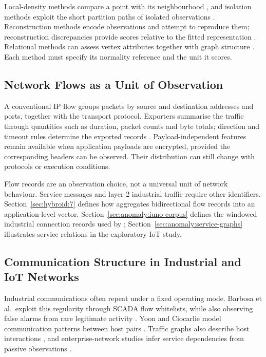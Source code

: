 Local-density methods compare a point with its neighbourhood \cite{breunig2000lof}, and
isolation methods exploit the short partition paths of isolated observations
\cite{liu2008isolation}. Reconstruction methods encode observations and attempt to reproduce
them; reconstruction discrepancies provide scores relative to the fitted representation
\cite{ruff2021unifying,pang2021deep}. Relational methods can assess vertex attributes
together with graph structure \cite{akoglu2015graph}. Each method must specify its normality
reference and the unit it scores.

\subsection{Network Flows as a Unit of Observation}
\label{sec:background:networks:flows}

A conventional IP flow groups packets by source and destination addresses and ports, together
with the transport protocol. Exporters summarise the traffic through quantities such as
duration, packet counts and byte totals; direction and timeout rules determine the exported
records \cite{sperotto2010overview}. Payload-independent features remain available when
application payloads are encrypted, provided the corresponding headers can be observed.
Their distribution can still change with protocols or execution conditions.

Flow records are an observation choice, not a universal unit of network behaviour. Service
messages and layer-2 industrial traffic require other identifiers.
Section~\ref{sec:hybroid:7} defines how \hybroid{} aggregates bidirectional flow records into
an application-level vector. Section~\ref{sec:anomaly:iuno-corpus} defines the windowed industrial
connection records used by \nadics{}; Section~\ref{sec:anomaly:service-graphs} illustrates
service relations in the exploratory IoT study.

\subsection{Communication Structure in Industrial and IoT Networks}
\label{sec:background:networks:industrial}

Industrial communications often repeat under a fixed operating mode. Barbosa et al.\ exploit
this regularity through SCADA flow whitelists, while also observing false alarms from rare
legitimate activity \cite{barbosa2013flow}. Yoon and Ciocarlie model communication patterns
between host pairs \cite{yoon2014communication}. Traffic graphs also describe host
interactions \cite{iliofotou2007network,jin2009unveiling}, and enterprise-network studies
infer service dependencies from passive observations
\cite{bahl2007towards,chen2008automating,natarajan2012nsdminer}.

